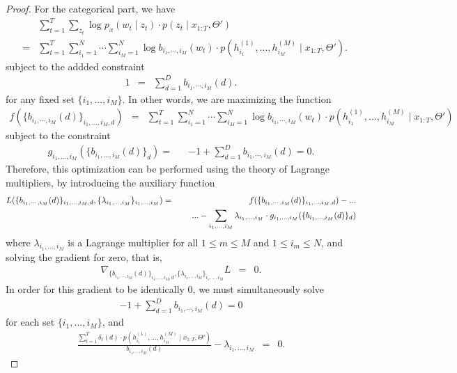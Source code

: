 \documentclass{amsart}
\begin{document}
\begin{proof}
For the categorical part, we have 
\begin{eqnarray*}
&&\sum_{t=1}^T\sum_{z_t}\log p_x(w_t\mid z_t)\cdot p(z_t\mid x_{1:T},\Theta')\\
& = &\sum_{t=1}^T\sum_{i_1=1}^N\cdots \sum_{i_M=1}^N\log b_{i_1,\cdots ,i_M}(w_t)\cdot p(h_{i_1}^{(1)},...,h_{i_M}^{(M)}\mid x_{1:T},\Theta').
\end{eqnarray*}
subject to the addded constraint 
\begin{eqnarray*}
1 &=&\sum_{d=1}^Db_{i_1,\cdots ,i_M}(d).
\end{eqnarray*}
for any fixed set $\{i_1,...,i_M\}$.  In other words, we are maximizing the function 
\begin{eqnarray*}
f(\{b_{i_1,\cdots ,i_M}(d)\}_{i_1,...,i_M,d})& = &\sum_{t=1}^T\sum_{i_1=1}^N\cdots \sum_{i_M=1}^N\log b_{i_1,\cdots ,i_M}(w_t)\cdot p(h_{i_1}^{(1)},...,h_{i_M}^{(M)}\mid x_{1:T},\Theta')
\end{eqnarray*}
subject to the constraint
\begin{eqnarray*}
g_{i_1,...,i_M}(\{b_{i_1,...,i_M}(d)\}_d)=&&-1+\sum_{d=1}^Db_{i_1,\cdots ,i_M}(d)=0.
\end{eqnarray*}
Therefore, this optimization can be performed using the theory of Lagrange multipliers, by introducing the auxiliary function 
\begin{eqnarray*}
L(\{b_{i_1,\cdots ,i_M}(d)\}_{i_1,...,i_M,d}, \{\lambda_{i_1,...,i_M}\}_{i_1,...,i_M}) & = & f(\{b_{i_1,\cdots ,i_M}(d)\}_{i_1,...,i_M,d}) - ...\\
&&\hspace{5mm} ...-\sum_{i_1,...,i_M}\lambda_{i_1,...,i_M}\cdot g_{i_1,...,i_M}(\{b_{i_1,...,i_M}(d)\}_d)
\end{eqnarray*}
where $\lambda_{i_1,...,i_M}$ is a Lagrange multiplier for all $1\leq m\leq M$ and $1\leq i_m\leq N$, and solving the gradient for zero, that is,
\begin{eqnarray*}
\nabla_{\{b_{i_1,\cdots ,i_M}(d)\}_{i_1,...,i_M,d}, \{\lambda_{i_1,...,i_M}\}_{i_1,...,i_M}}L & = & 0.
\end{eqnarray*}
In order for this gradient to be identically 0, we must simultaneously solve 
\begin{eqnarray}\label{eqn:grad5}
-1+\sum_{d=1}^Db_{i_1,\cdots ,i_M}(d)=0
\end{eqnarray}
for each set $\{i_1,...,i_M\}$, and 
\begin{eqnarray}\label{eqn:grad6}
\frac{\sum_{t=1}^T\delta_t(d)\cdot p(h_{i_1}^{(1)},...,h_{i_M}^{(M)}\mid x_{1:T},\Theta')}{b_{i_1,...,i_M}(d)}-\lambda_{i_1,...,i_M} & = & 0.

\end{eqnarray}
\end{proof}
\end{document}
